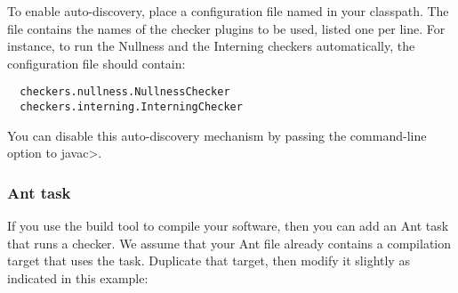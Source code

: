 To enable auto-discovery, place a configuration file named
in your classpath.  The file contains the names of the checker plugins to
be used, listed one per line.  For instance, to run the Nullness and the
Interning checkers automatically, the configuration file should contain:

\begin{smaller}
\begin{Verbatim}
  checkers.nullness.NullnessChecker
  checkers.interning.InterningChecker
\end{Verbatim}
\end{smaller}

You can disable this auto-discovery mechanism by passing the
 command-line option to \<javac>.




\subsubsection{Ant task\label{ant-task}}

If you use the  build tool to compile
your software, then you can add an Ant task that runs a checker.  We assume
that your Ant file already contains a compilation target that uses the
 task.  Duplicate that target, then modify it slightly as
indicated in this example:

